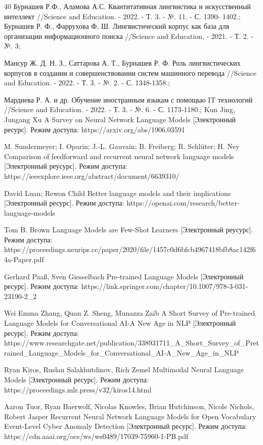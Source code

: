 \documentclass{article}
\begin{document}
\begin{thebibliography} {40}
Бурнашев Р.Ф., Аламова А.С. Квантитативная лингвистика и искусственный интеллект //Science and Education. - 2022. - Т. 3. - №. 11. - С. 1390- 1402.;
 Бурнашев Р. Ф., Фаррухова Ф. Ш. Лингвистический корпус как база для организации информационного поиска //Science and Education. - 2021. - Т. 2. - №. 3;

Мансур Ж. Д. Н. З., Саттарова А. Т., Бурнашев Р. Ф. Роль лингвистических корпусов в создании и совершенствовании систем машинного перевода //Science and Education. - 2022. - Т. 3. - №. 2. - С. 1348-1358.;

Мардиева Р. А. и др. Обучение иностранным языкам с помощью IT технологий //Science and Education. - 2022. - Т. 3. - №. 6. - С. 1173-1180.;
Kun Jing, Jungang Xu A Survey on Neural Network Language Models [Электронный ресурс]. Режим доступа: https://arxiv.org/abs/1906.03591

M. Sundermeyer; I. Oparin; J.-L. Gauvain; B. Freiberg; R. Schlüter; H. Ney Comparison of feedforward and recurrent neural network language models [Электронный реусурс]. Режим доступа: https://ieeexplore.ieee.org/abstract/document/6639310/

 David Luan; Rewon Child Better language models and their implications [Электронный ресурс].
Режим доступа: https://openai.com/research/better-language-models

Tom B. Brown Language Models are Few-Shot Learners [Электронный реусурс]. Режим доступа: 
https://proceedings.neurips.cc/paper/2020/file/1457c0d6bfcb4967418bfb8ac142f64a-Paper.pdf

Gerhard Paaß, Sven Giesselbach Pre-trained Language Models [Электронный ресурс]. Режим доступа: {https://link.springer.com/chapter/10.1007/978-3-031-23190-2\_2}

Wei Emma Zhang, Quan Z. Sheng, Munazza Zaib A Short Survey of Pre-trained Language Models for Conversational AI-A New Age in NLP [Электронный ресурс]. Режим доступа: https://www.researchgate.net/publication/338931711_A_Short_Survey_of_Pretrained_Language_Models_for_Conversational_AI-A_New_Age_in_NLP

Ryan Kiros, Ruslan Salakhutdinov, Rich Zemel Multimodal Neural Language Models [Электронный ресурс]. Режим доступа: https://proceedings.mlr.press/v32/kiros14.html

Aaron Tuor, Ryan Baerwolf, Nicolas Knowles, Brian Hutchinson, Nicole Nichols, Robert Jasper Recurrent Neural Network Language Models for Open Vocabulary Event-Level Cyber Anomaly Detection  [Электронный ресурс]. Режим доступа: https://cdn.aaai.org/ocs/ws/ws0489/17039-75960-1-PB.pdf


\end{thebibliography}
\end{document}
